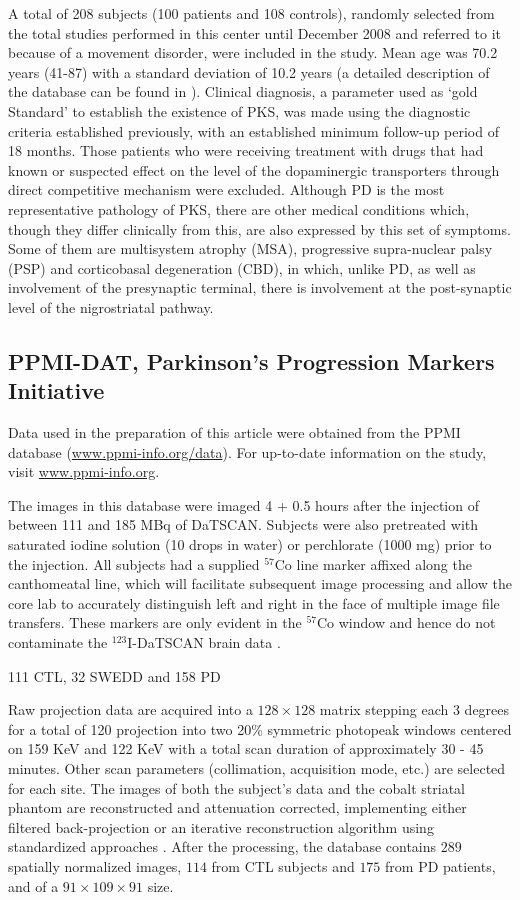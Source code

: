 A total of 208 subjects (100 patients and 108 controls), randomly selected from the total studies performed in this center until December 2008 and referred to it because of a movement disorder, were included in the study. Mean age was 70.2 years (41-87) with a standard deviation of 10.2 years (a detailed description of the database can be found in \cite{Lozano2007}). Clinical diagnosis, a parameter used as `gold Standard' to establish the existence of \ac{PKS}, was made using the diagnostic criteria established previously, with an established minimum follow-up period of 18 months. Those patients who were receiving treatment with drugs that had known or suspected effect on the level of the dopaminergic transporters through direct competitive mechanism were excluded. Although \ac{PD} is the most representative pathology of \ac{PKS}, there are other medical conditions which, though they differ clinically from this, are also expressed by this set of symptoms. Some of them are multisystem atrophy (MSA), progressive supra-nuclear palsy (PSP) and corticobasal degeneration (CBD), in which, unlike \ac{PD}, as well as involvement of the presynaptic terminal, there is involvement at the post-synaptic level of the nigrostriatal pathway. 

\subsection{PPMI-DAT, Parkinson's Progression Markers Initiative}\label{sec:ppmi}
Data used in the preparation of this article were obtained from the \acf{PPMI} database (\url{www.ppmi-info.org/data}). For up-to-date information on the study, visit \url{www.ppmi-info.org}.

The images in this database were imaged 4 + 0.5 hours after the injection of between 111 and 185 MBq of DaTSCAN. Subjects were also pretreated with saturated iodine solution (10 drops in water) or perchlorate (1000 mg) prior to the injection. All subjects had a supplied $^{57}$Co line marker affixed along the canthomeatal line, which will facilitate subsequent image processing and allow the core lab to accurately distinguish left and right in the face of multiple image file transfers. These markers are only evident in the $^{57}$Co window and hence do not contaminate the $^{123}$I-DaTSCAN brain data \cite{PPMI,Inititative2010}. 

111 \ac{CTL}, 32 \ac{SWEDD} and 158 \ac{PD}

Raw projection data are acquired into a $128 \times 128$ matrix stepping each 3 degrees for a total of 120 projection into two 20\% symmetric photopeak windows centered on 159 KeV and 122 KeV with a total scan duration of approximately 30 - 45 minutes. Other scan parameters (collimation, acquisition mode, etc.) are selected for each site. The images of both the subject's data and the cobalt striatal phantom are reconstructed and attenuation corrected, implementing either filtered back-projection or an iterative reconstruction algorithm using standardized approaches \cite{Inititative2010}. After the processing, the database contains $289$ spatially normalized images, $114$ from \ac{CTL} subjects and $175$ from \ac{PD} patients, and of a $91\times109\times91$ size. 